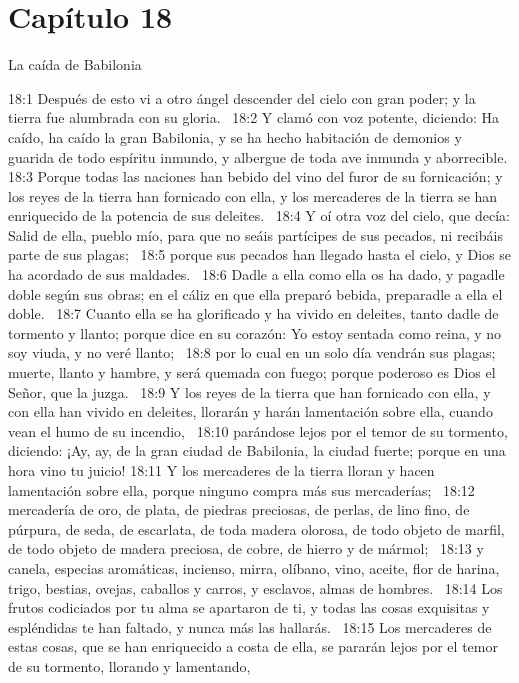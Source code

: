 \section*{Capítulo 18}
La caída de Babilonia  

18:1 Después de esto vi a otro ángel descender del cielo con gran poder; y la tierra fue alumbrada con su gloria.  
18:2 Y clamó con voz potente, diciendo: Ha caído, ha caído la gran Babilonia, y se ha hecho habitación de demonios y guarida de todo espíritu inmundo, y albergue de toda ave inmunda y aborrecible. 
18:3 Porque todas las naciones han bebido del vino del furor de su fornicación; y los reyes de la tierra han fornicado con ella, y los mercaderes de la tierra se han enriquecido de la potencia de sus deleites.  
18:4 Y oí otra voz del cielo, que decía: Salid de ella, pueblo mío, para que no seáis partícipes de sus pecados, ni recibáis parte de sus plagas;  
18:5 porque sus pecados han llegado hasta el cielo, y Dios se ha acordado de sus maldades.  
18:6 Dadle a ella como ella os ha dado, y pagadle doble según sus obras; en el cáliz en que ella preparó bebida, preparadle a ella el doble.  
18:7 Cuanto ella se ha glorificado y ha vivido en deleites, tanto dadle de tormento y llanto; porque dice en su corazón: Yo estoy sentada como reina, y no soy viuda, y no veré llanto;  
18:8 por lo cual en un solo día vendrán sus plagas; muerte, llanto y hambre, y será quemada con fuego; porque poderoso es Dios el Señor, que la juzga.  
18:9 Y los reyes de la tierra que han fornicado con ella, y con ella han vivido en deleites, llorarán y harán lamentación sobre ella, cuando vean el humo de su incendio,  
18:10 parándose lejos por el temor de su tormento, diciendo: ¡Ay, ay, de la gran ciudad de Babilonia, la ciudad fuerte; porque en una hora vino tu juicio! 
18:11 Y los mercaderes de la tierra lloran y hacen lamentación sobre ella, porque ninguno compra más sus mercaderías;  
18:12 mercadería de oro, de plata, de piedras preciosas, de perlas, de lino fino, de púrpura, de seda, de escarlata, de toda madera olorosa, de todo objeto de marfil, de todo objeto de madera preciosa, de cobre, de hierro y de mármol;  
18:13 y canela, especias aromáticas, incienso, mirra, olíbano, vino, aceite, flor de harina, trigo, bestias, ovejas, caballos y carros, y esclavos, almas de hombres.  
18:14 Los frutos codiciados por tu alma se apartaron de ti, y todas las cosas exquisitas y espléndidas te han faltado, y nunca más las hallarás.  
18:15 Los mercaderes de estas cosas, que se han enriquecido a costa de ella, se pararán lejos por el temor de su tormento, llorando y lamentando,  
